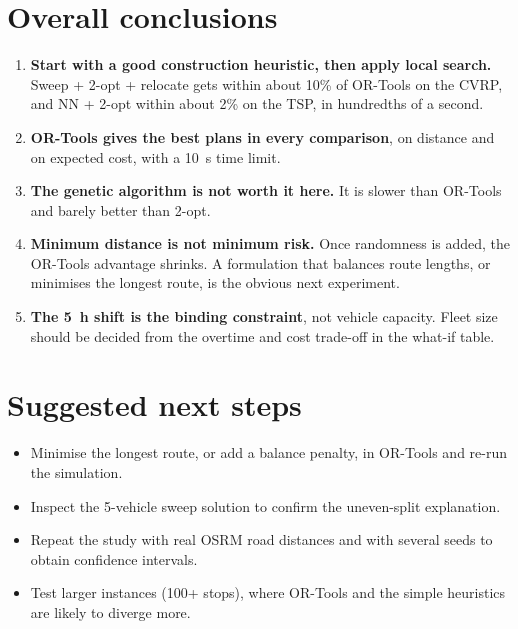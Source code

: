 \documentclass[11pt,a4paper]{article}
\begin{document}
\section{Overall conclusions}
\begin{enumerate}
  \item \textbf{Start with a good construction heuristic, then apply local search.} Sweep + 2-opt + relocate
        gets within about 10\% of OR-Tools on the CVRP, and NN + 2-opt within about 2\% on the TSP, in
        hundredths of a second.
  \item \textbf{OR-Tools gives the best plans in every comparison}, on distance and on expected cost, with a
        10~s time limit.
  \item \textbf{The genetic algorithm is not worth it here.} It is slower than OR-Tools and barely better than
        2-opt.
  \item \textbf{Minimum distance is not minimum risk.} Once randomness is added, the OR-Tools advantage
        shrinks. A formulation that balances route lengths, or minimises the longest route, is the obvious
        next experiment.
  \item \textbf{The 5~h shift is the binding constraint}, not vehicle capacity. Fleet size should be decided
        from the overtime and cost trade-off in the what-if table.
\end{enumerate}

\section{Suggested next steps}
\begin{itemize}
  \item Minimise the longest route, or add a balance penalty, in OR-Tools and re-run the simulation.
  \item Inspect the 5-vehicle sweep solution to confirm the uneven-split explanation.
  \item Repeat the study with real OSRM road distances and with several seeds to obtain confidence intervals.
  \item Test larger instances (100+ stops), where OR-Tools and the simple heuristics are likely to diverge more.
\end{itemize}
\end{document}
